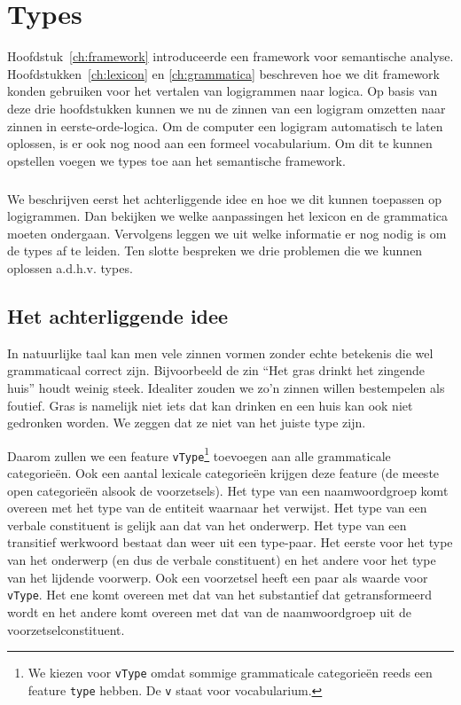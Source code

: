 \chapter{Types}
\label{ch:types}

Hoofdstuk~\ref{ch:framework} introduceerde een framework voor semantische analyse. Hoofdstukken~\ref{ch:lexicon} en \ref{ch:grammatica} beschreven hoe we dit framework konden gebruiken voor het vertalen van logigrammen naar logica. Op basis van deze drie hoofdstukken kunnen we nu de zinnen van een logigram omzetten naar zinnen in eerste-orde-logica. Om de computer een logigram automatisch te laten oplossen, is er ook nog nood aan een formeel vocabularium. Om dit te kunnen opstellen voegen we types toe aan het semantische framework.

\paragraph{} We beschrijven eerst het achterliggende idee en hoe we dit kunnen toepassen op logigrammen. Dan bekijken we welke aanpassingen het lexicon en de grammatica moeten ondergaan. Vervolgens leggen we uit welke informatie er nog nodig is om de types af te leiden. Ten slotte bespreken we drie problemen die we kunnen oplossen a.d.h.v. types.

\section{Het achterliggende idee}
In natuurlijke taal kan men vele zinnen vormen zonder echte betekenis die wel grammaticaal correct zijn. Bijvoorbeeld de zin ``Het gras drinkt het zingende huis'' houdt weinig steek. Idealiter zouden we zo'n zinnen willen bestempelen als foutief. Gras is namelijk niet iets dat kan drinken en een huis kan ook niet gedronken worden. We zeggen dat ze niet van het juiste type zijn.

Daarom zullen we een feature \texttt{vType}\footnote{We kiezen voor \texttt{vType} omdat sommige grammaticale categorieën reeds een feature \texttt{type} hebben. De \texttt{v} staat voor vocabularium.} toevoegen aan alle grammaticale categorieën. Ook een aantal lexicale categorieën krijgen deze feature (de meeste open categorieën alsook de voorzetsels). Het type van een naamwoordgroep komt overeen met het type van de entiteit waarnaar het verwijst. Het type van een verbale constituent is gelijk aan dat van het onderwerp. Het type van een transitief werkwoord bestaat dan weer uit een type-paar. Het eerste voor het type van het onderwerp (en dus de verbale constituent) en het andere voor het type van het lijdende voorwerp. Ook een voorzetsel heeft een paar als waarde voor \texttt{vType}. Het ene komt overeen met dat van het substantief dat getransformeerd wordt en het andere komt overeen met dat van de naamwoordgroep uit de voorzetselconstituent.


